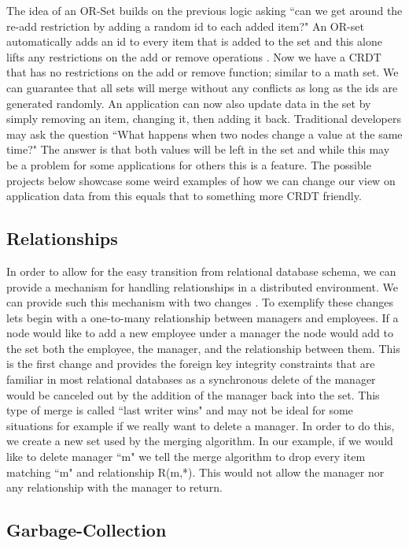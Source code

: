 \documentclass{article}
\begin{document}
\begin{multicols}{2}
\begin{refsection}
The idea of an OR-Set builds on the previous logic asking ``can we get around the re-add restriction by adding a random id to each added item?" An OR-set automatically adds an id to every item that is added to the set and this alone lifts any restrictions on the add or remove operations \cite{shapiro_comprehensive_2011}. Now we have a CRDT that has no restrictions on the add or remove function; similar to a math set. We can guarantee that all sets will merge without any conflicts as long as the ids are generated randomly. An application can now also update data in the set by simply removing an item, changing it, then adding it back. Traditional developers may ask the question ``What happens when two nodes change a value at the same time?" The answer is that both values will be left in the set and while this may be a problem for some applications for others this is a feature. The possible projects below showcase some weird examples of how we can change our view on application data from this equals that to something more CRDT friendly.

\subsection*{Relationships}

In order to allow for the easy transition from relational database schema, we can provide a mechanism for handling relationships in a distributed environment. We can provide such this mechanism with two changes \cite{balegas_making_2016}. To exemplify these changes lets begin with a one-to-many relationship between managers and employees. If a node would like to add a new employee under a manager the node would add to the set both the employee, the manager, and the relationship between them. This is the first change and provides the foreign key integrity constraints that are familiar in most relational databases as a synchronous delete of the manager would be canceled out by the addition of the manager back into the set. This type of merge is called ``last writer wins" and may not be ideal for some situations for example if we really want to delete a manager. In order to do this, we create a new set used by the merging algorithm. In our example, if we would like to delete manager ``m" we tell the merge algorithm to drop every item matching ``m" and relationship R(m,*). This would not allow the manager nor any relationship with the manager to return.

\subsection*{Garbage-Collection}


\end{refsection}
\end{multicols}
\end{document}
